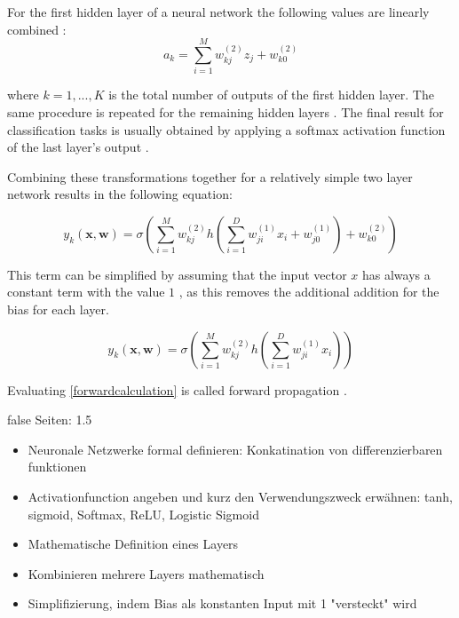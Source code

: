 \documentclass[draft,final,oneside]{vutinfth} %
\begin{document}
For the first hidden layer of a neural network the following values are linearly combined \cite{bishop}:
\begin{equation}
a_k = \sum_{i=1}^{M} w_{kj}^{(2)}z_j + w_{k0}^{(2)}
\end{equation}

where $k = 1, ..., K$ is the total number of outputs of the first hidden layer. The same procedure is repeated for the remaining hidden layers \cite{bishop}. The final result for classification tasks is usually obtained by applying a softmax activation function of the last layer's output \cite{bishop}.

Combining these transformations together for a relatively simple two layer network results in the following equation:

\begin{equation}
y_k(\boldsymbol{x}, \boldsymbol{w}) = \sigma\left(\sum_{i=1}^{M} w_{kj}^{(2)}h\left(\sum_{i=1}^{D} w_{ji}^{(1)}x_i + w_{j0}^{(1)}\right) + w_{k0}^{(2)}\right)
\end{equation}

This term can be simplified by assuming that the input vector $x$ has always a constant term with the value $1$ \cite{bishop}, as this removes the additional addition for the bias for each layer.

\begin{equation} \label{forwardcalculation}
y_k(\boldsymbol{x}, \boldsymbol{w}) = \sigma\left(\sum_{i=1}^{M} w_{kj}^{(2)}h\left(\sum_{i=1}^{D} w_{ji}^{(1)}x_i\right)\right)
\end{equation}

Evaluating \ref{forwardcalculation} is called forward propagation \cite{colahbackprop}.

\if false
Seiten: 1.5
\begin{itemize}
\item Neuronale Netzwerke formal definieren: Konkatination von differenzierbaren funktionen
\item Activationfunction angeben und kurz den Verwendungszweck erwähnen: tanh, sigmoid, Softmax, ReLU, Logistic Sigmoid
\item Mathematische Definition eines Layers
\item Kombinieren mehrere Layers mathematisch
\item Simplifizierung, indem Bias als konstanten Input mit 1 "versteckt" wird

\end{itemize}

\fi
\end{document}
